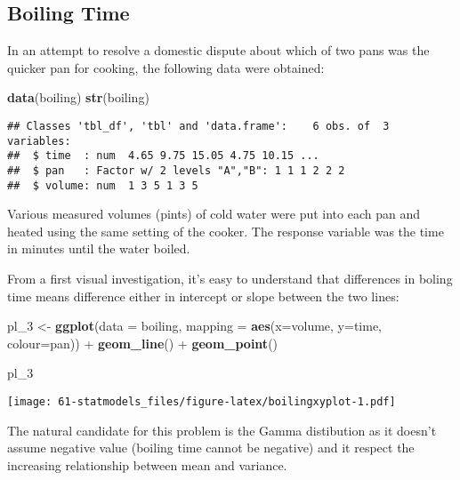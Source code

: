 \documentclass[]{book}
\newenvironment{Shaded}{\begin{snugshade}}{\end{snugshade}}
\newcommand{\KeywordTok}[1]{\textcolor[rgb]{0.13,0.29,0.53}{\textbf{{#1}}}}
\newcommand{\DataTypeTok}[1]{\textcolor[rgb]{0.13,0.29,0.53}{{#1}}}
\newcommand{\StringTok}[1]{\textcolor[rgb]{0.31,0.60,0.02}{{#1}}}
\newcommand{\NormalTok}[1]{{#1}}
\begin{document}
\clearpage

\subsection{Boiling Time}\label{boiling-time}

In an attempt to resolve a domestic dispute about which of two pans was
the quicker pan for cooking, the following data were obtained:

\begin{Shaded}
\begin{Highlighting}[]
\KeywordTok{data}\NormalTok{(boiling)}
\KeywordTok{str}\NormalTok{(boiling)}
\end{Highlighting}
\end{Shaded}

\begin{verbatim}
## Classes 'tbl_df', 'tbl' and 'data.frame':    6 obs. of  3 variables:
##  $ time  : num  4.65 9.75 15.05 4.75 10.15 ...
##  $ pan   : Factor w/ 2 levels "A","B": 1 1 1 2 2 2
##  $ volume: num  1 3 5 1 3 5
\end{verbatim}

Various measured volumes (pints) of cold water were put into each pan
and heated using the same setting of the cooker. The response variable
was the time in minutes until the water boiled.

From a first visual investigation, it's easy to understand that
differences in boling time means difference either in intercept or slope
between the two lines:

\begin{Shaded}
\begin{Highlighting}[]
\NormalTok{pl_3 <-}\StringTok{ }\KeywordTok{ggplot}\NormalTok{(}\DataTypeTok{data =} \NormalTok{boiling, }\DataTypeTok{mapping =} \KeywordTok{aes}\NormalTok{(}\DataTypeTok{x=}\NormalTok{volume, }\DataTypeTok{y=}\NormalTok{time, }\DataTypeTok{colour=}\NormalTok{pan)) +}\StringTok{ }
\StringTok{  }\KeywordTok{geom_line}\NormalTok{() +}\StringTok{ }\KeywordTok{geom_point}\NormalTok{()}

\NormalTok{pl_3}
\end{Highlighting}
\end{Shaded}

\texttt{[image: 61-statmodels\_files/figure-latex/boilingxyplot-1.pdf]}

The natural candidate for this problem is the Gamma distibution as it
doesn't assume negative value (boiling time cannot be negative) and it
respect the increasing relationship between mean and variance.
\end{document}
